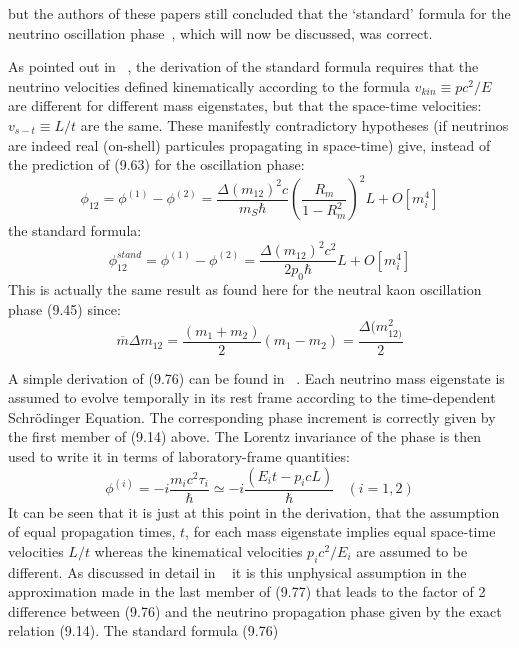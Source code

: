 \documentclass [12pt]{article}
\begin{document}
{ but the authors of these papers still concluded that the `standard' formula for the
  neutrino oscillation phase~\cite{Kays04}, which will now be discussed, was correct.
   \par As pointed out in ~\cite{JHF1}, the derivation of the standard formula requires that
   the neutrino velocities defined kinematically according to the formula $v_{kin} \equiv p c^2/E$ are
    different for different mass eigenstates, but that the space-time velocities: $v_{s-t} \equiv L/t$ are the same.
    These manifestly contradictory hypotheses (if neutrinos are indeed real (on-shell) particules propagating
   in space-time) give, instead of the prediction of (9.63) for the oscillation phase:
   \begin{equation}
    \phi_{12} = \phi^{(1)}-  \phi^{(2)} = \frac{\Delta(m_{12})^2 c}{m_S \hbar} \left(\frac{R_m}{1-R_m^2} \right)^2 L 
     +O[m_i^4]
     \end{equation} 
  the standard formula:
   \begin{equation}
    \phi_{12}^{stand} = \phi^{(1)}-  \phi^{(2)} = \frac{\Delta(m_{12})^2 c^2}{2 p_0 \hbar} L 
     +O[m_i^4]
   \end{equation} 
  This is actually the same result as found here for the neutral kaon oscillation phase
 (9.45) since:
   \[ \overline{m} \Delta m_{12} = \frac{(m_1+m_2)}{2}(m_1-m_2) = \frac{\Delta(m_{12)}^2}{2} \]
    \par A simple derivation of (9.76) can be found in ~\cite{Kays04}. Each neutrino mass
   eigenstate is assumed to evolve temporally in its rest frame according to the time-dependent
   Schr\"{o}dinger Equation. The corresponding phase increment is correctly given by
   the first member of (9.14) above. The Lorentz invariance of the phase is then used to write it
  in terms of laboratory-frame quantities:
  \begin{equation}
    \phi^{(i)} = -i \frac{m_ic^2 \tau_i}{\hbar} \simeq -i\frac{(E_i t - p_i c L)}{\hbar}~~~~(i=1,2)
   \end{equation} 
   It can be seen that it is just at this point in the derivation, that the assumption
  of equal propagation times, $t$, for each mass eigenstate implies equal space-time velocities
  $L/t$ whereas the kinematical velocities $p_i c^2/E_i$ are assumed to be different.
  As discussed in detail in ~\cite{JHF1} it is this unphysical assumption in the
   approximation made in the last member of (9.77) that leads
 to the factor of 2 difference between (9.76) 
   and the neutrino propagation phase given by the exact relation (9.14). The standard formula (9.76)
}
\end{document}
